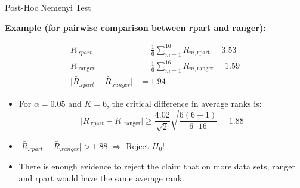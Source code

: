 \documentclass[11pt,compress,t,notes=noshow, xcolor=table]{beamer}
\begin{document}
\begin{frame}{Post-Hoc Nemenyi Test}

\textbf{Example (for pairwise comparison between rpart and ranger):}

\begin{align*}
    \bar{R}_{.rpart} &= \frac{1}{6} \sum_{m=1}^{16} R_{m, \text{rpart}} = 3.53 \\
    \bar{R}_{.\text{ranger}} &= \frac{1}{6} \sum_{m=1}^{16} R_{m, \text{ranger}} = 1.59 \\
    \vert \bar{R}_{.rpart} - \bar{R}_{.ranger} \vert &= 1.94
\end{align*}
\begin{itemize}
    \item For $\alpha = 0.05$ and $K = 6$, the critical difference in average ranks is:
    $$
    \vert \bar{R}_{.\text{rpart}} - \bar{R}_{..\text{ranger}} \vert \geq \frac{4.02}{\sqrt{2}} \sqrt{\frac{6(6 + 1)}{6 \cdot 16}}
     = 1.88 $$
    \item $\vert \bar{R}_{.rpart} - \bar{R}_{.ranger} \vert > 1.88$ $\Rightarrow$ Reject $H_0$!
    \item There is enough evidence to reject the claim that on more data sets, ranger and rpart would have the same average rank.
\end{itemize}
\end{frame}
\end{document}
